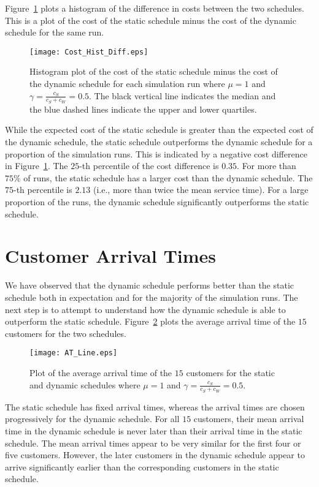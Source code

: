 Figure~\ref{fig:Diff_Cost} plots a histogram of the difference in costs between the two schedules. This is a plot of the cost of the static schedule minus the cost of the dynamic schedule for the same run.
\begin{figure}[htb]
	\centering
	\texttt{[image: Cost\_Hist\_Diff.eps]}
	\caption{Histogram plot of the cost of the static schedule minus the cost of the dynamic schedule for each simulation run where $\mu = 1$ and $\gamma = \frac{c_{S}}{c_{S} + c_{W}} = 0.5$. The black vertical line indicates the median and the blue dashed lines indicate the upper and lower quartiles.}
	\label{fig:Diff_Cost}
\end{figure}

While the expected cost of the static schedule is greater than the expected cost of the dynamic schedule, the static schedule outperforms the dynamic schedule for a proportion of the simulation runs. This is indicated by a negative cost difference in Figure~\ref{fig:Diff_Cost}. The $25$-th percentile of the cost difference is $0.35$. For more than $75 \%$ of runs, the static schedule has a larger cost than the dynamic schedule. The $75$-th percentile is $2.13$ (i.e., more than twice the mean service time). For a large proportion of the runs, the dynamic schedule significantly outperforms the static schedule.

\section{Customer Arrival Times}
We have observed that the dynamic schedule performs better than the static schedule both in expectation and for the majority of the simulation runs. The next step is to attempt to understand how the dynamic schedule is able to outperform the static schedule. Figure~\ref{fig:Avg_Arrival} plots the average arrival time of the $15$ customers for the two schedules.
\begin{figure}[htb]
	\centering
	\texttt{[image: AT\_Line.eps]}
	\caption{Plot of the average arrival time of the $15$ customers for the static and dynamic schedules where $\mu = 1$ and $\gamma = \frac{c_{S}}{c_{S} + c_{W}} = 0.5$.}
	\label{fig:Avg_Arrival}
\end{figure}

The static schedule has fixed arrival times, whereas the arrival times are chosen progressively for the dynamic schedule. For all $15$ customers, their mean arrival time in the dynamic schedule is never later than their arrival time in the static schedule. The mean arrival times appear to be very similar for the first four or five customers. However, the later customers in the dynamic schedule appear to arrive significantly earlier than the corresponding customers in the static schedule.

